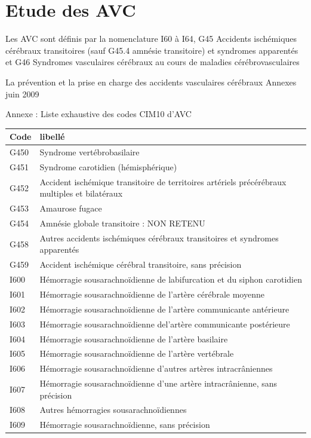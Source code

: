 \documentclass[12pt,english,french,twoside]{report}\usepackage[]{graphicx}\usepackage[]{color}
\begin{document}
\section{Etude des AVC}

Les AVC sont définis par la nomenclature I60 à I64, G45 Accidents ischémiques cérébraux transitoires (sauf G45.4 amnésie transitoire) et syndromes apparentés et G46 Syndromes vasculaires cérébraux au cours de maladies cérébrovasculaires

La prévention et la prise en charge des accidents vasculaires cérébraux  Annexes 
juin 2009

Annexe : Liste exhaustive des codes CIM10 d’AVC

\begin{longtable}{|l|l|}
 \hline
 Code & libellé\\
 \hline
 G450 & Syndrome vertébrobasilaire \\
 G451 & Syndrome carotidien (hémisphérique) \\
 G452 & Accident ischémique transitoire de territoires artériels précérébraux multiples et bilatéraux \\
 G453 & Amaurose fugace \\
 G454 & Amnésie globale transitoire : NON RETENU \\
 G458 & Autres accidents ischémiques cérébraux transitoires et syndromes apparentés \\
 G459 & Accident ischémique cérébral transitoire, sans précision \\
 I600 & Hémorragie sousarachnoïdienne de labifurcation et du siphon carotidien \\
 I601 & Hémorragie sousarachnoïdienne de l'artère cérébrale moyenne \\
 I602 & Hémorragie sousarachnoïdienne de l'artère communicante antérieure \\
 I603 & Hémorragie sousarachnoïdienne del'artère communicante postérieure \\
 I604 & Hémorragie sousarachnoïdienne de l'artère basilaire \\
 I605 & Hémorragie sousarachnoïdienne de l'artère vertébrale \\
 I606 & Hémorragie sousarachnoïdienne d'autres artères intracrâniennes \\
 I607 & Hémorragie sousarachnoïdienne d'une artère intracrânienne, sans précision \\
 I608 & Autres hémorragies sousarachnoïdiennes \\
 I609 & Hémorragie sousarachnoïdienne, sans précision \\

\end{longtable}
\end{document}
